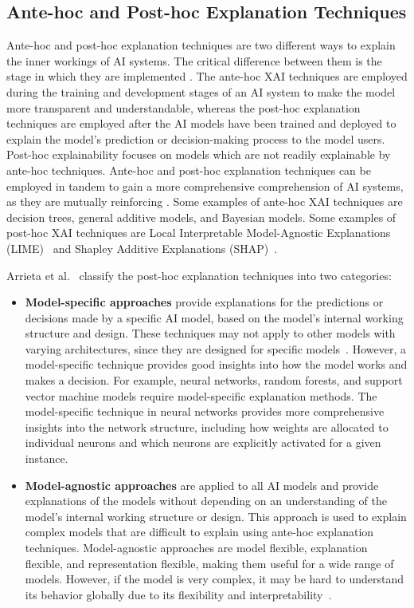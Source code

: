 \documentclass[final,5p,times,twocolumn]{elsarticle}
\begin{document}
\subsection{Ante-hoc and Post-hoc Explanation Techniques}
Ante-hoc and post-hoc explanation techniques are two different ways to explain the inner workings of AI systems. The critical difference between them is the stage in which they are implemented \cite{guidotti2018survey}. The ante-hoc XAI techniques are employed during the training and development stages of an AI system to make the model more transparent and understandable, whereas the post-hoc explanation techniques are employed after the AI models have been trained and deployed to explain the model's prediction or decision-making process to the model users. Post-hoc explainability focuses on models which are not readily explainable by ante-hoc techniques. Ante-hoc and post-hoc explanation techniques can be employed in tandem to gain a more comprehensive comprehension of AI systems, as they are mutually reinforcing \cite{arrieta2020explainable}. Some examples of ante-hoc XAI techniques are decision trees, general additive models, and Bayesian models. Some examples of post-hoc XAI techniques are Local Interpretable Model-Agnostic Explanations (LIME)~\cite{ribeiro2016should} and Shapley Additive Explanations (SHAP)~\cite{lundberg2017unified}.

Arrieta et al.~\cite{arrieta2020explainable} classify the post-hoc explanation techniques into two categories:
\begin{itemize}
    \item \textbf{Model-specific approaches} provide explanations for the predictions or decisions made by a specific AI model, based on the model's internal working structure and design. These techniques may not apply to other models with varying architectures, since they are designed for specific models~\cite{vilone2020explainable}. However, a model-specific technique provides good insights into how the model works and makes a decision. For example, neural networks, random forests, and support vector machine models require model-specific explanation methods. The model-specific technique in neural networks provides more comprehensive insights into the network structure, including how weights are allocated to individual neurons and which neurons are explicitly activated for a given instance.
    \item \textbf{Model-agnostic approaches} are applied to all AI models and provide explanations of the models without depending on an understanding of the model's internal working structure or design. This approach is used to explain complex models that are difficult to explain using ante-hoc explanation techniques.	Model-agnostic approaches are model flexible, explanation flexible, and representation flexible, making them useful for a wide range of models. However, if the model is very complex, it may be hard to understand its behavior globally due to its flexibility and interpretability~\cite{ribeiro2016model}.
\end{itemize}
\end{document}
